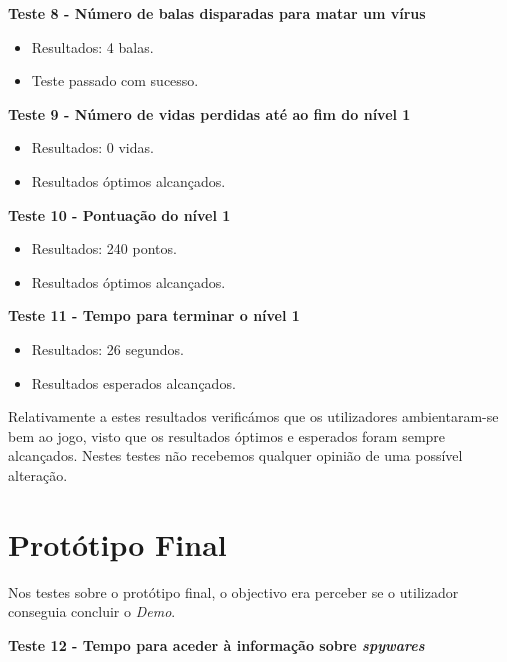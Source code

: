 \textbf{Teste 8 - Número de balas disparadas para matar um vírus}

\begin{itemize}

\item Resultados: 4 balas.

\item Teste passado com sucesso.
\end{itemize}

\textbf{Teste 9 - Número de vidas perdidas até ao fim do nível 1}

\begin{itemize}

\item Resultados: 0 vidas.

\item Resultados óptimos alcançados.
\end{itemize}

\textbf{Teste 10 - Pontuação do nível 1}

\begin{itemize}

\item Resultados: 240 pontos.

\item Resultados óptimos alcançados.
\end{itemize}

\textbf{Teste 11 - Tempo para terminar o nível 1}

\begin{itemize}

\item Resultados: 26 segundos.

\item Resultados esperados alcançados.
\end{itemize}

Relativamente a estes resultados verificámos que os utilizadores ambientaram-se bem ao jogo, visto que os resultados óptimos e esperados foram sempre alcançados. Nestes testes não recebemos qualquer opinião de uma possível alteração.

\section{Protótipo Final}
Nos testes sobre o protótipo final, o objectivo era perceber se o utilizador conseguia concluir o \textit{Demo}.

\textbf{Teste 12 - Tempo para aceder à informação sobre \textit{spywares}}


